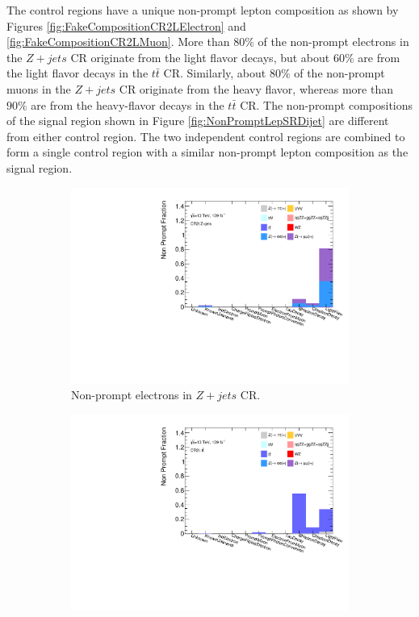 The control regions have a unique non-prompt lepton composition as shown by Figures \ref{fig:FakeCompositionCR2LElectron} and \ref{fig:FakeCompositionCR2LMuon}. More than $80\%$ of the non-prompt electrons in the $Z+jets$ CR originate from the light flavor decays, but about $60\%$ are from the light flavor decays in the $t\bar{t}$ CR. Similarly, about $80\%$ of the non-prompt muons in the $Z+jets$ CR originate from the heavy flavor, whereas more than $90\%$ are from the heavy-flavor decays in the $t\bar{t}$ CR. The non-prompt compositions of the signal region shown in Figure \ref{fig:NonPromptLepSRDijet} are different from either control region. The two independent control regions are combined to form a single control region with a similar non-prompt lepton composition as the signal region.

\begin{figure}[!htb]
    \begin{subfigure}{.48\textwidth}
      \centering
      \includegraphics[width=.9\linewidth]{figures/Analysis/Background/NonPromptComposition_ZplusX_Electrons.pdf}  
      \caption{Non-prompt electrons in $Z+jets$ CR.}
    \end{subfigure}
    \begin{subfigure}{.48\textwidth}
      \centering
      \includegraphics[width=.9\linewidth]{figures/Analysis/Background/NonPromptComposition_ttbar_Electrons.pdf}

\end{subfigure}
\end{figure}
